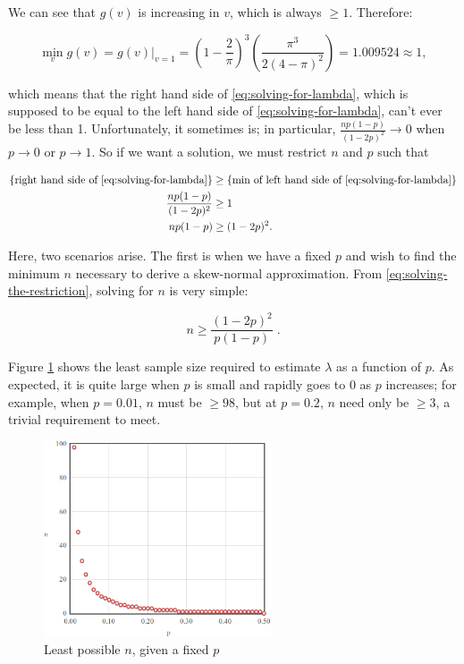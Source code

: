 \documentclass{article}
\begin{document}
We can see that $g(v)$ is increasing in $v$, which is always $\geq 1$.
Therefore:

\begin{equation}
  \min_{v} g(v) = g(v)|_{v=1} = \left( 1 - \frac{2}{\pi} \right)^3 \left( \frac{\pi^3}{2(4-\pi)^2} \right) = 1.009524 \approx 1,
\end{equation}

which means that the right hand side of \eqref{eq:solving-for-lambda}, which is
supposed to be equal to the left hand side of \eqref{eq:solving-for-lambda},
can't ever be less than 1. Unfortunately, it sometimes is; in particular,
$\frac{np(1-p)}{(1-2p)^2} \to 0$ when $p \to 0$ or $p \to 1$. So if we want a
solution, we must restrict $n$ and $p$ such that

\begin{align}
  \textnormal{\{right hand side of \eqref{eq:solving-for-lambda}\}} &\geq \textnormal{\{min of left hand side of \eqref{eq:solving-for-lambda}\}} \nonumber \\
  \frac{np(1-p)}{(1-2p)^2} &\geq 1 \nonumber \\
  np(1-p) &\geq (1-2p)^2. \label{eq:solving-the-restriction}
\end{align}

Here, two scenarios arise. The first is when we have a fixed $p$ and wish to
find the minimum $n$ necessary to derive a skew-normal approximation. From
\eqref{eq:solving-the-restriction}, solving for $n$ is very simple:

\begin{equation}
  n \geq \frac{(1-2p)^2}{p(1-p)} \;. \label{eq: n for a given p}
\end{equation}

Figure \ref{fig:sn-restriction-least-n} shows the least sample size required to
estimate $\lambda$ as a function of $p$. As expected, it is quite large when
$p$ is small and rapidly goes to 0 as $p$ increases; for example, when $p =
0.01$, $n$ must be $\geq 98$, but at $p = 0.2$, $n$ need only be $\geq 3$, a
trivial requirement to meet.

\begin{figure}
  \centering
  \includegraphics[width=0.6\textwidth]{../images/restriction-least-n.png}
  \caption{Least possible $n$, given a fixed $p$}
  \label{fig:sn-restriction-least-n}
\end{figure}
\end{document}
